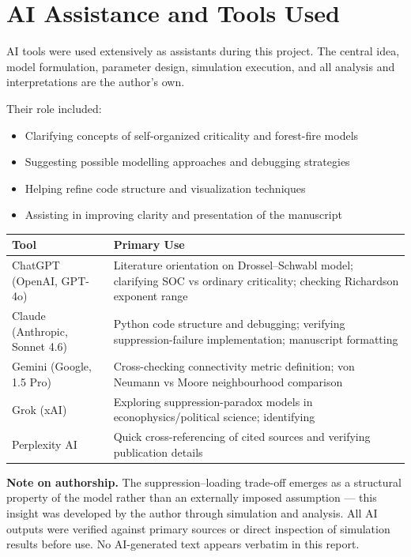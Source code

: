 \documentclass[12pt,a4paper]{article}
\begin{document}
\section*{AI Assistance and Tools Used}

AI tools were used extensively as assistants during this project. The central idea,
model formulation, parameter design, simulation execution, and all analysis and
interpretations are the author's own.

Their role included:
\begin{itemize}[leftmargin=1.5em]
  \item Clarifying concepts of self-organized criticality and forest-fire models
  \item Suggesting possible modelling approaches and debugging strategies
  \item Helping refine code structure and visualization techniques
  \item Assisting in improving clarity and presentation of the manuscript
\end{itemize}

\medskip
\begin{tabular}{@{}p{}p{}@{}}
\toprule
\textbf{Tool} & \textbf{Primary Use} \\
\midrule
ChatGPT (OpenAI, GPT-4o) &
  Literature orientation on Drossel--Schwabl model; clarifying SOC vs ordinary
  criticality; checking Richardson exponent range \\[4pt]
Claude (Anthropic, Sonnet 4.6) &
  Python code structure and debugging; verifying suppression-failure implementation;
  manuscript formatting \\[4pt]
Gemini (Google, 1.5 Pro) &
  Cross-checking connectivity metric definition; von Neumann vs Moore neighbourhood
  comparison \\[4pt]
Grok (xAI) &
  Exploring suppression-paradox models in econophysics/political science;
  identifying \citet{cederman2003} \\[4pt]
Perplexity AI &
  Quick cross-referencing of cited sources and verifying publication details \\
\bottomrule
\end{tabular}

\medskip
\begin{mdframed}[style=infobox]
\textbf{Note on authorship.}
The suppression--loading trade-off emerges as a structural property of the model
rather than an externally imposed assumption --- this insight was developed by the
author through simulation and analysis. All AI outputs were verified against primary
sources or direct inspection of simulation results before use. No AI-generated text
appears verbatim in this report.
\end{mdframed}
\end{document}
